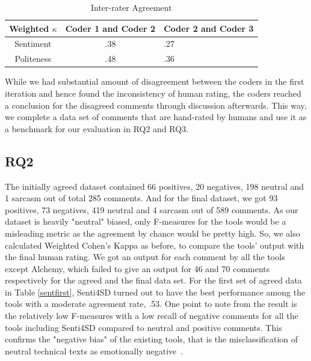 \vspace{3mm}
\noindent{}
\vspace{3mm}


\begin{table}
\centering
\caption{Inter-rater Agreement}
  \label{interrater}
  \begin{tabular}{|c|c|l|}
    \toprule
    Weighted $\kappa$ & Coder 1 and Coder 2 &  Coder 2 and  Coder 3\\
    \midrule
    Sentiment & .38 & .27 \\
    \hline
    Politeness & .48 & .36\\
  \bottomrule
\end{tabular}
\end{table}

While we had substantial amount of disagreement between the coders in the first iteration and hence found the inconsistency of human rating, the coders reached a conclusion for the disagreed comments through discussion afterwards. This way, we complete a data set of comments that are hand-rated by humans and use it as a benchmark for our evaluation in RQ2 and RQ3.

\subsection{RQ2}
The initially agreed dataset contained 66 positives, 20 negatives, 198 neutral and 1 sarcasm out of total 285 comments. And for the final dataset, we got 93 positives, 73 negatives, 419 neutral and 4 sarcasm out of 589 comments. As our dataset is heavily "neutral" biased, only F-measures for the tools would be a misleading metric as the agreement by chance would be pretty high. So, we also calculated Weighted Cohen's Kappa as before, to compare the tools' output with the final human rating. We got an output for each comment by all the tools except Alchemy, which failed to give an output for 46 and 70 comments respectively for the agreed and the final data set. 
For the first set of agreed data in Table \ref{sentfirst}, Senti4SD turned out to have the best performance among the tools with a  moderate agreement rate, .53. One point to note from the result is the relatively low F-measures with a low recall of negative comments for all the tools including Senti4SD compared to neutral and positive comments. This confirms the "negative bias" of the existing tools, that is the misclassification of neutral
technical texts as emotionally negative~\cite{blaz2016sentiment,novielli2015challenges,calefato2017sentiment}.

